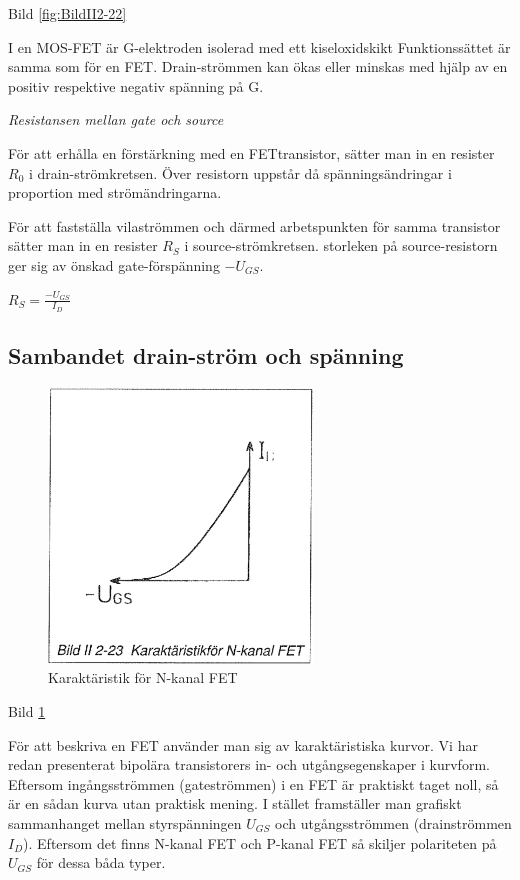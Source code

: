 Bild \ref{fig:BildII2-22}

I en MOS-FET är G-elektroden isolerad med ett kiseloxidskikt Funktionssättet är
samma som för en FET. Drain-strömmen kan ökas eller minskas med hjälp av en
positiv respektive negativ spänning på G.

\emph{Resistansen mellan gate och source}

För att erhålla en förstärkning med en FETtransistor, sätter man in en resister
\(R_0\) i drain-strömkretsen. Över resistorn uppstår då spänningsändringar i
proportion med strömändringarna.

För att fastställa vilaströmmen och därmed arbetspunkten för samma transistor
sätter man in en resister \(R_S\) i source-strömkretsen. storleken på
source-resistorn ger sig av önskad gate-förspänning \(-U_{GS}\).

\(R_S = \frac{-U_{GS}}{I_D}\)

\subsection{Sambandet drain-ström och spänning}

\begin{figure}[h]
\begin{center}
\includegraphics[width=7cm]{images/bild_2_2-23}
\caption{Karaktäristik för N-kanal FET}
\label{fig:BildII2-23}
\end{center}
\end{figure}

Bild \ref{fig:BildII2-23}

För att beskriva en FET använder man sig av karaktäristiska kurvor. Vi har redan
presenterat bipolära transistorers in- och utgångsegenskaper i kurvform.
Eftersom ingångsströmmen (gateströmmen) i en FET är praktiskt taget noll, så är
en sådan kurva utan praktisk mening. I stället framställer man grafiskt
sammanhanget mellan styrspänningen \(U_{GS}\) och utgångsströmmen (drainströmmen
\(I_D\)). Eftersom det finns N-kanal FET och P-kanal FET så skiljer polariteten
på \(U_{GS}\) för dessa båda typer.
